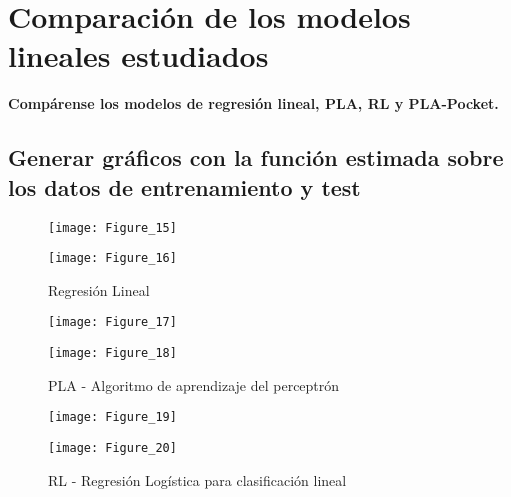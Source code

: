 \section{Comparación de los modelos lineales estudiados}

\textbf{Compárense los modelos de regresión lineal, PLA, RL y PLA-Pocket.}

\subsection{Generar gráficos con la función estimada sobre los datos de entrenamiento y test}

\begin{figure}[H]
    \caption{Regresión Lineal\medskip}
    \begin{minipage}[b]{.5\linewidth}
      \centering
      \texttt{[image: Figure\_15]}
       \label{subfig-5:dummy62}
    \end{minipage}
    \hfill \hfill
    \begin{minipage}[b]{.5\linewidth}
      \centering
      \texttt{[image: Figure\_16]}
    \end{minipage}
    \label{fig:dummy62}
\end{figure}

\begin{figure}[H]
    \caption{PLA - Algoritmo de aprendizaje del perceptrón\medskip}
    \begin{minipage}[b]{.5\linewidth}
      \centering
      \texttt{[image: Figure\_17]}
       \label{subfig-5:dummy63}
    \end{minipage}
    \hfill \hfill
    \begin{minipage}[b]{.5\linewidth}
      \centering
      \texttt{[image: Figure\_18]}
    \end{minipage}
    \label{fig:dummy63}
\end{figure}

\begin{figure}[H]
    \caption{RL - Regresión Logística para clasificación lineal\medskip}
    \begin{minipage}[b]{.5\linewidth}
      \centering
      \texttt{[image: Figure\_19]}
       \label{subfig-5:dummy64}
    \end{minipage}
    \hfill \hfill
    \begin{minipage}[b]{.5\linewidth}
      \centering
      \texttt{[image: Figure\_20]}
    \end{minipage}
    \label{fig:dummy64}
\end{figure}



